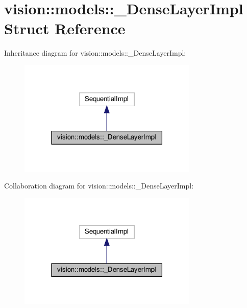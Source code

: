 \hypertarget{structvision_1_1models_1_1__DenseLayerImpl}{}\section{vision\+:\+:models\+:\+:\+\_\+\+Dense\+Layer\+Impl Struct Reference}
\label{structvision_1_1models_1_1__DenseLayerImpl}


Inheritance diagram for vision\+:\+:models\+:\+:\+\_\+\+Dense\+Layer\+Impl\+:
\nopagebreak
\begin{figure}[H]
\begin{center}
\leavevmode
\includegraphics[width=242pt]{structvision_1_1models_1_1__DenseLayerImpl__inherit__graph}
\end{center}
\end{figure}


Collaboration diagram for vision\+:\+:models\+:\+:\+\_\+\+Dense\+Layer\+Impl\+:
\nopagebreak
\begin{figure}[H]
\begin{center}
\leavevmode
\includegraphics[width=242pt]{structvision_1_1models_1_1__DenseLayerImpl__coll__graph}
\end{center}
\end{figure}
